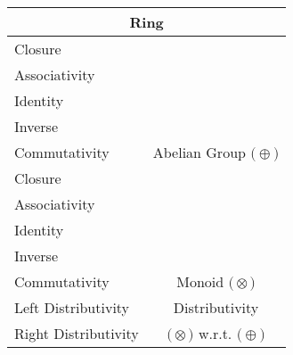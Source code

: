 \documentclass[a4paper,12pt]{scrartcl}
\newcommand{\OpA}{\otimes}
\newcommand{\OpB}{\oplus}
\begin{document}
\begin{minipage}[c]{0,5\textwidth}
\vspace{0.6cm}
\begin{tabular}{|l|c|} %
  \hline
  \multicolumn{2}{c}{\cellcolor{green!25}Ring} \\
  \hline
    \cellcolor{blue!25} Closure& \cellcolor{yellow!25}  \\
    \cellcolor{blue!25} Associativity& \cellcolor{yellow!25}  \\
    \cellcolor{blue!25} Identity& \cellcolor{yellow!25} \\
    \cellcolor{blue!25} Inverse& \cellcolor{yellow!25} \\
    \cellcolor{blue!25} Commutativity& \multirow{-5}{*}{\tiny\cellcolor{yellow!25}Abelian Group $\big(\OpB\big)$} \\
   \hline
    \cellcolor{blue!25} Closure& \cellcolor{yellow!25}  \\
    \cellcolor{blue!25} Associativity& \cellcolor{yellow!25}  \\
    \cellcolor{blue!25} Identity& \cellcolor{yellow!25} \\
    \cellcolor{red!25} Inverse& \cellcolor{yellow!25} \\
    \cellcolor{red!25} Commutativity& \multirow{-5}{*}{\tiny\cellcolor{yellow!25}Monoid $\big(\OpA\big)$} \\
  \hline    
	\cellcolor{blue!25} Left Distributivity&  \tiny\cellcolor{yellow!25}Distributivity\\
    \cellcolor{blue!25} Right Distributivity & \tiny\cellcolor{yellow!25} $\big(\OpA\big)$ w.r.t. $\big(\OpB\big)$  \\
   \hline
\end{tabular}


\end{minipage}
\end{document}
